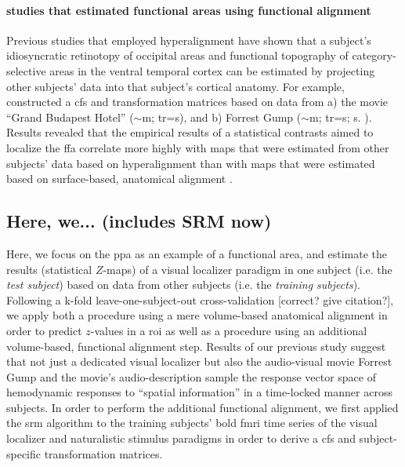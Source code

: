 \paragraph{studies that estimated functional areas using functional alignment}

Previous studies \citep{jiahui2020predicting, guntupalli2016model,
haxby2011common} that employed hyperalignment have shown that a subject's
idiosyncratic retinotopy of occipital areas and functional topography of
category-selective areas in the ventral temporal cortex can be estimated by
projecting other subjects' data into that subject's cortical anatomy.
For example, \citep{jiahui2020predicting} constructed a \ac{cfs}
and transformation matrices based on data from a) the movie ``Grand Budapest
Hotel'' ($\sim$\unit[50]{m}; \ac{tr}=\unit[1]{s}), and b) Forrest Gump
($\sim$\unit[120]{m}; \ac{tr}=\unit[2]{s}; s. \citep{hanke2016simultaneous}).
Results revealed that the empirical results of a statistical contrasts aimed to
localize the \ac{ffa} correlate more highly with maps that were estimated from
other subjects' data based on hyperalignment than with maps that were estimated
based on surface-based, anatomical alignment \citep{jiahui2020predicting}.


\subsection{Here, we... (includes SRM now)}

Here, we focus on the \ac{ppa} as an example of a functional area, and estimate
the results (statistical $Z$-maps) of a visual localizer paradigm in one subject
(i.e. the \textit{test subject}) based on data from other subjects (i.e. the
\textit{training subjects}).
%
Following a k-fold leave-one-subject-out cross-validation [correct? give
citation?], we apply both a procedure using a mere volume-based anatomical
alignment in order to predict $z$-values in a \ac{roi} as well as a procedure
using an additional volume-based, functional alignment step.
%
Results of our previous study suggest \citep{haeusler2022processing} that not
just a dedicated visual localizer \citep{sengupta2016extension} but also the
audio-visual movie Forrest Gump \citep{hanke2016simultaneous} and the movie's
audio-description \citep{hanke2014audiomovie} sample the response vector space
of hemodynamic responses to ``spatial information'' in a time-locked manner
across subjects.
%
In order to perform the additional functional alignment, we first applied the
\ac{srm} algorithm \citep{chen2015reduced, richard2019fast} to the training
subjects' \ac{bold} \ac{fmri} time series of the visual localizer and
naturalistic stimulus paradigms in order to derive a \ac{cfs} and
subject-specific transformation matrices.


